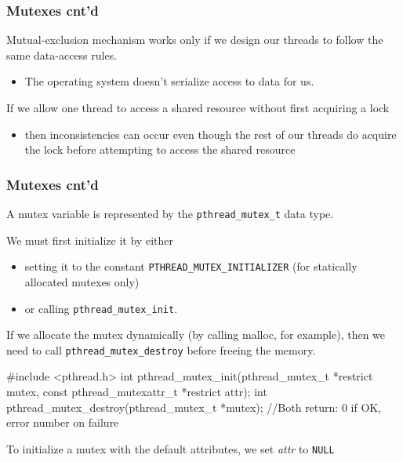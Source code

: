 \documentclass[newPxFont,sthlmFooter,nooffset]{beamer}
\begin{document}
\begin{frame}[t]
  \frametitle{Mutexes cnt'd}
Mutual-exclusion mechanism works only if we design our threads to follow the same data-access rules. 
\begin{itemize}
\item The operating system doesn’t serialize access to data for us.
\end{itemize}

If we allow one thread to access a shared resource without first
  acquiring a lock
  \begin{itemize}
  \item then inconsistencies can occur even though the rest of our
    threads do acquire the lock before attempting to access the shared
    resource
  \end{itemize}
\end{frame}


\begin{frame}[fragile,t]
  \frametitle{Mutexes cnt'd}
A mutex variable is represented by the \texttt{pthread\_mutex\_t} data type. 

We must first initialize it by either
\begin{itemize}
\item setting it to the constant \texttt{PTHREAD\_MUTEX\_INITIALIZER}
  (for statically allocated mutexes only)
\item or calling \texttt{pthread\_mutex\_init}. 
\end{itemize}

If we allocate the mutex dynamically (by calling malloc, for example),
then we need to call \texttt{pthread\_mutex\_destroy} before freeing the memory.

\begin{codedef}
#include <pthread.h>
int pthread_mutex_init(pthread_mutex_t *restrict mutex, 
                       const pthread_mutexattr_t *restrict attr); 
int pthread_mutex_destroy(pthread_mutex_t *mutex);
//Both return: 0 if OK, error number on failure
\end{codedef}

To initialize a mutex with the default attributes, we set \textit{attr} to \texttt{NULL}
\end{frame}
\end{document}
